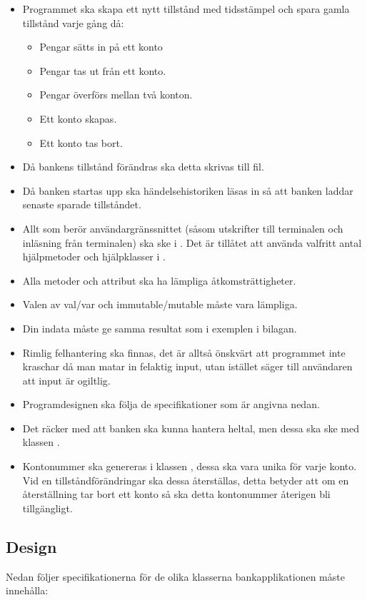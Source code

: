 \begin{itemize}
\item Programmet ska skapa ett nytt tillstånd med tidsstämpel och spara gamla tillstånd varje gång då:
\begin{itemize}
\item Pengar sätts in på ett konto
\item Pengar tas ut från ett konto.
\item Pengar överförs mellan två konton.
\item Ett konto skapas.
\item Ett konto tas bort.
\end{itemize}
\item Då bankens tillstånd förändras ska detta skrivas till fil.
\item Då banken startas upp ska händelsehistoriken läsas in så att banken laddar senaste sparade tillståndet.
\item Allt som berör användargränssnittet (såsom utskrifter till terminalen och inläsning från terminalen) ska ske i . Det är tillåtet att använda valfritt antal hjälpmetoder och hjälpklasser i .
\item Alla metoder och attribut ska ha lämpliga åtkomsträttigheter.
\item Valen av val/var och immutable/mutable måste vara lämpliga.
\item Din indata måste ge samma resultat som i exemplen i bilagan.
\item Rimlig felhantering ska finnas, det är alltså önskvärt att programmet inte kraschar då man matar in felaktig input, utan istället säger till användaren att input är ogiltlig.
\item Programdesignen ska följa de specifikationer som är angivna nedan.
\item Det räcker med att banken ska kunna hantera heltal, men dessa ska ske med klassen .
\item Kontonummer ska genereras i klassen , dessa ska vara unika för varje konto. Vid en tillståndförändringar ska dessa återställas, detta betyder att om en återställning tar bort ett konto så ska detta kontonummer återigen bli tillgängligt.
\end{itemize}

\subsection{Design}
Nedan följer specifikationerna för de olika klasserna bankapplikationen måste innehålla:


